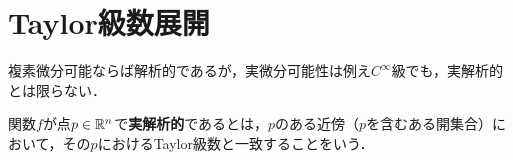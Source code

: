 \documentclass[uplatex,dvipdfmx]{jsreport}
\begin{document}
\section{Taylor級数展開}

\begin{tcolorbox}[colframe=ForestGreen, colback=ForestGreen!10!white, breakable ,colbacktitle=ForestGreen!40!white, coltitle=black,fonttitle=\bfseries\sffamily,
    title=全体のポイント]
    複素微分可能ならば解析的であるが，実微分可能性は例え$C^\infty$級でも，実解析的とは限らない．
\end{tcolorbox}

\begin{definition}
    関数$f$が点$p\in\mathbb{R}^n$で\textbf{実解析的}であるとは，$p$のある近傍（$p$を含むある開集合）において，その$p$におけるTaylor級数と一致することをいう．
\end{definition}
\end{document}
